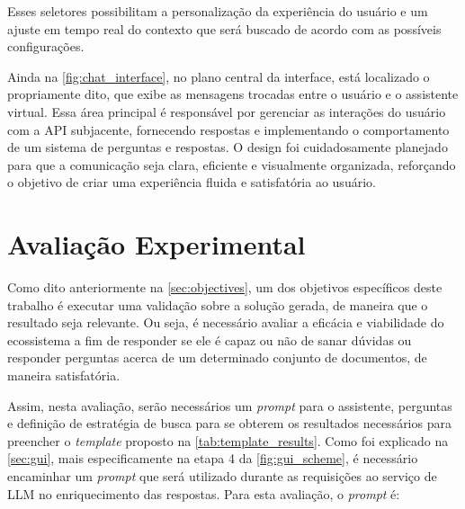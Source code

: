 \documentclass[a4paper, 12pt]{article}
\begin{document}
    Esses seletores possibilitam a personalização da experiência do usuário e um ajuste em tempo real do contexto que será buscado de acordo com as possíveis configurações.

    Ainda na \autoref{fig:chat_interface}, no plano central da interface, está localizado o  propriamente dito, que exibe as mensagens trocadas entre o usuário e o assistente virtual. Essa área principal é responsável por gerenciar as interações do usuário com a API subjacente, fornecendo respostas e implementando o comportamento de um sistema de perguntas e respostas. O design foi cuidadosamente planejado para que a comunicação seja clara, eficiente e visualmente organizada, reforçando o objetivo de criar uma experiência fluida e satisfatória ao usuário.

    \section{Avaliação Experimental} \label{sec:experiment}

    Como dito anteriormente na \autoref{sec:objectives}, um dos objetivos específicos deste trabalho é executar uma validação sobre a solução gerada, de maneira que o resultado seja relevante. Ou seja, é necessário avaliar a eficácia e viabilidade do ecossistema a fim de responder se ele é capaz ou não de sanar dúvidas ou responder perguntas acerca de um determinado conjunto de documentos, de maneira satisfatória. 
    
    Assim, nesta avaliação, serão necessários um \textit{prompt} para o assistente, perguntas e definição de estratégia de busca para se obterem os resultados necessários para preencher o \textit{template} proposto na \autoref{tab:template_results}. Como foi explicado na \autoref{sec:gui}, mais especificamente na etapa 4 da \autoref{fig:gui_scheme}, é necessário encaminhar um \textit{prompt} que será utilizado durante as requisições ao serviço de LLM no enriquecimento das respostas. Para esta avaliação, o \textit{prompt} é:
\end{document}
